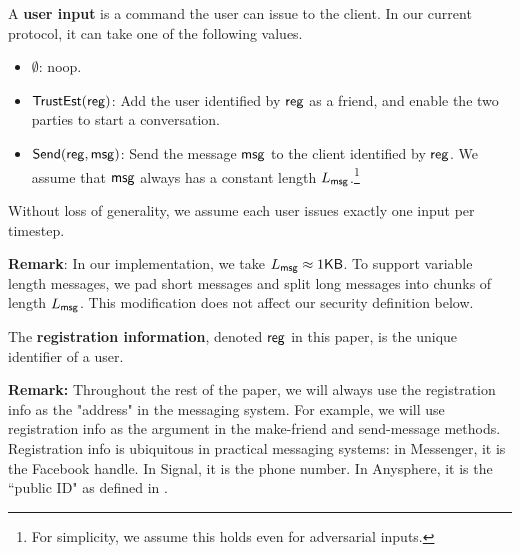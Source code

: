 \begin{definition}
\label{defn:messaging-user-input}
A \textbf{user input} is a command the user can issue to the client. In our current protocol, it can take one of the following values.
\begin{itemize}
    \item $\emptyset$: noop.
    \item $\mathsf{TrustEst}(\mathsf{reg})$: Add the user identified by $\mathsf{reg}$ as a friend, and enable the two parties to start a conversation.
    \item $\mathsf{Send}(\mathsf{reg}, \mathsf{msg})$: Send the message $\mathsf{msg}$ to the client identified by $\mathsf{reg}$. We assume that $\mathsf{msg}$ always has a constant length $L_{\mathsf{msg}}$.\footnote{For simplicity, we assume this holds even for adversarial inputs.}
\end{itemize}

Without loss of generality, we assume each user issues exactly one input per timestep.
\end{definition}
\textbf{Remark}:  In our implementation, we take $L_{\mathsf{msg}} \approx 1\mathsf{KB}$. To support variable length messages, we pad short messages and split long messages into chunks of length $L_{\mathsf{msg}}$. This modification does not affect our security definition below.
\begin{definition}
\label{defn:messaging-registration-info}
The \textbf{registration information}, denoted $\mathsf{reg}$ in this paper, is the unique identifier of a user.
\end{definition}
\textbf{Remark: }Throughout the rest of the paper, we will always use the registration info as the "address" in the messaging system. For example, we will use registration info as the argument in the make-friend and send-message methods. Registration info is ubiquitous in practical messaging systems: in Messenger, it is the Facebook handle. In Signal, it is the phone number. In Anysphere, it is the ``public ID" as defined in \cite[Figure 6]{whitepaper}.
